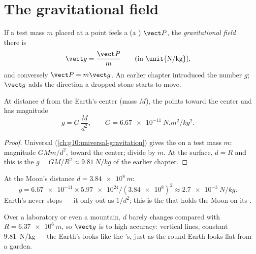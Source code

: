 \section{The gravitational field}

\begin{definition}\label{def:g11:electric-gravitational-fields:gfield}
If a test mass $m$ placed at a point feels a  (a
) $\vect P$, the \emph{gravitational field} there is
\[
\vect g = \frac{\vect P}{m} \qquad \text{(in \unit{N/kg})},
\]
and conversely $\vect P = m \vect g$. An earlier chapter introduced the
number $g$; $\vect g$ adds the direction a dropped stone starts to move.
\end{definition}

\begin{proposition}\label{prop:g11:electric-gravitational-fields:earth}
At distance $d$ from the Earth's center (mass $M$), the  points toward the center and has magnitude
\[
g = G\,\frac{M}{d^2},
\qquad G = \qty{6.67e-11}{N.m^2/kg^2}.
\]
\end{proposition}

\begin{proof}
Universal  (\cref{ch:g10:universal-gravitation}) gives the
 on a test mass $m$: magnitude $G M m / d^2$, toward the center;
divide by $m$. At the surface, $d = R$ and this is the
$g = GM/R^2 \approx \qty{9.81}{N/kg}$ of the earlier chapter.
\end{proof}

\begin{example}\label{ex:g11:electric-gravitational-fields:moon}
At the Moon's distance $d = \qty{3.84e8}{m}$:
\[
g = \num{6.67e-11} \times \num{5.97e24} / (\num{3.84e8})^2
\approx \qty{2.7e-3}{N/kg}.
\]
Earth's  never stops --- it only  out as $1/d^2$; this is the
 that holds the Moon on its .
\end{example}

\begin{remark}\label{rem:g11:electric-gravitational-fields:uniformg}
Over a laboratory or even a mountain, $d$ barely changes compared with
$R = \qty{6.37e6}{m}$, so $\vect g$ is  to high accuracy:
vertical lines, constant \qty{9.81}{N/kg} --- the Earth's  looks
like the 's, just as the round Earth looks flat from a garden.
\end{remark}

